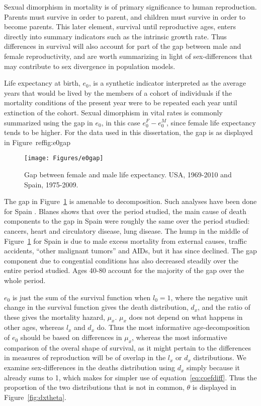  \FloatBarrier
Sexual dimorphism in mortality is of primary significance to human reproduction.
Parents must survive in order to parent, and children must survive in order to
become parents. This later element, survival until reproductive ages, enters
directly into summary indicators such as the intrinsic growth rate. Thus
differences in survival will also account for part of the gap between male and
female reproductivity, and are worth summarizing in light of sex-differences
that may contribute to sex divergence in population models.

Life expectancy at birth, $e_0$, is a synthetic indicator interpreted as the
average years that would be lived by the members of a cohort of individuals if
the mortality conditions of the present year were to be repeated each year until extinction of
the cohort. Sexual dimorphism in vital rates is commonly summarized using the
gap in $e_0$, in this case $e_0^F - e_0^M$, since female life expectancy tends
to be higher. For the data used in this dissertation, the gap is as displayed in
Figure~ref{fig:e0gap}

\begin{figure}[!ht]
  \centering
    \caption{Gap between female and male life expectancy. USA,
    1969-2010 and Spain, 1975-2009.}
     \texttt{[image: Figures/e0gap]}
     \label{fig:e0gap}
\end{figure}

The gap in Figure~\ref{fig:e0gap} is amenable to decomposition. Such analyses
have been done for Spain \citep[pp 217-218 and 447]{amand2007thesis}. Blanes
shows that over the period studied, the main cause of death components to the
gap in Spain were roughly the same over the period studied: cancers, heart
and circulatory disease, lung disease. The hump in the middle of
Figure~\ref{fig:e0gap} for Spain is due to male excess mortality from external
causes, traffic accidents, ``other malignant tumors'' and AIDs, but it has
since declined. The gap component due to congential conditions has also
decreased steadily over the entire period studied. Ages 40-80 account for the
majority of the gap over the whole period.


$e_0$ is just the sum of the survival function when $l_0 = 1$, where the
negative unit change in the survival function gives the death distribution,
$d_x$, and the ratio of these gives the mortality hazard, $\mu _x$. $\mu_x$ does
not depend on what happens in other ages, whereas $l_x$ and $d_x$ do. Thus the
most informative age-decomposition of $e_0$ should be based on differences in
$\mu _x$, whereas the most informative comparison of the overal shape of
survival, as it might pertain to the differences in measures of reproduction
will be of overlap in the $l_x$ or $d_x$ distributions. We examine
sex-differences in the deaths distribution using $d_x$ simply
because it already sums to 1, which makes for simpler use of
equation~\eqref{eq:coefdiff}. Thus the proportion of the two distributions that
is not in common, $\theta$ is displayed in Figure~\ref{fig:dxtheta}.

